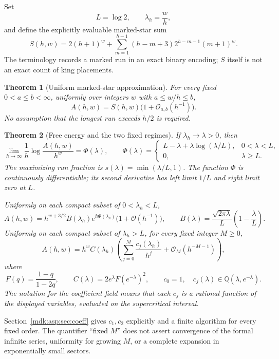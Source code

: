 \documentclass[11pt,letterpaper]{article}
\numberwithin{equation}{section}
\newtheorem{theorem}{Theorem}[section]
\theoremstyle{remark}\newtheorem{remark}[theorem]{Remark}
\newcommand{\Oh}{\mathcal O}\newcommand{\Q}{\mathbb Q}\newcommand{\N}{\mathbb N}\newcommand{\R}{\mathbb R}
\begin{document}
Set
\[
L=\log2,\qquad \lambda_h=\frac wh,
\]
and define the explicitly evaluable marked-star sum
\begin{equation}\label{mdk:asp:eq:S}
S(h,w)=2(h+1)^w+\sum_{m=1}^{h-1}(h-m+3)2^{h-m-1}(m+1)^w.
\end{equation}
The terminology records a marked run in an exact binary encoding; $S$ itself is not an exact count of king placements.

\begin{theorem}[Uniform marked-star approximation]\label{mdk:asp:thm:star}
For every fixed $0<a\le b<\infty$, uniformly over integers $w$ with $a\le w/h\le b$,
\begin{equation}\label{mdk:asp:eq:uniform}
A(h,w)=S(h,w)\bigl(1+\Oh_{a,b}(h^{-1})\bigr).
\end{equation}
No assumption that the longest run exceeds $h/2$ is required.
\end{theorem}

\begin{theorem}[Free energy and the two fixed regimes]\label{mdk:asp:thm:phases}
If $\lambda_h\to\lambda>0$, then
\begin{equation}\label{mdk:asp:eq:phi}
\lim_{h\to\infty}\frac1h\log\frac{A(h,w)}{h^w}=\Phi(\lambda),\qquad
\Phi(\lambda)=
\begin{cases}
L-\lambda+\lambda\log(\lambda/L),&0<\lambda<L,\\
0,&\lambda\ge L.
\end{cases}
\end{equation}
The maximizing run fraction is $s(\lambda)=\min(\lambda/L,1)$. The function $\Phi$ is continuously differentiable; its second derivative has left limit $1/L$ and right limit zero at $L$.

Uniformly on each compact subset of $0<\lambda_h<L$,
\begin{equation}\label{mdk:asp:eq:sub}
A(h,w)=h^{w+3/2}B(\lambda_h)e^{h\Phi(\lambda_h)}\bigl(1+\Oh(h^{-1})\bigr),\qquad
B(\lambda)=\frac{\sqrt{2\pi\lambda}}{L}\left(1-\frac\lambda L\right).
\end{equation}
Uniformly on each compact subset of $\lambda_h>L$, for every fixed integer $M\ge0$,
\begin{equation}\label{mdk:asp:eq:super}
A(h,w)=h^w C(\lambda_h)
\left(\sum_{j=0}^M\frac{c_j(\lambda_h)}{h^j}+\Oh_M(h^{-M-1})\right),
\end{equation}
where
\begin{equation}\label{mdk:asp:eq:C}
F(q)=\frac{1-q}{1-2q},\qquad
C(\lambda)=2e^\lambda F(e^{-\lambda})^2,\qquad
c_0=1,\quad c_j(\lambda)\in\Q(\lambda,e^{-\lambda}).
\end{equation}
The notation for the coefficient field means that each $c_j$ is a rational function of the displayed variables, evaluated on the supercritical interval.
\end{theorem}
Section~\ref{mdk:asp:sec:coeff} gives $c_1,c_2$ explicitly and a finite algorithm for every fixed order. The quantifier ``fixed $M$'' does not assert convergence of the formal infinite series, uniformity for growing $M$, or a complete expansion in exponentially small sectors.
\end{document}
